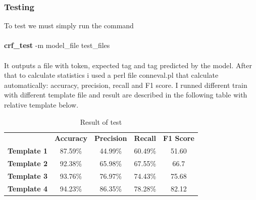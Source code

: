 \documentclass[a4paper,8pt,oneside]{article}
\begin{document}
		\subsubsection{Testing}
			To test we must simply run the command \\ \\
			\textbf{crf\_test} -m model\_file test\_files \\ \\
			It outputs a file with token, expected tag and tag predicted by the model. After that to calculate statistics i used a perl file conneval.pl that calculate automatically: accuracy, precision, recall and F1 score. I runned different train with different template file and result are described in the following table with relative template below.
			\begin{table}[h]
				\centering
				\begin{tabular}{ccccc}
					& \textbf{Accuracy} & \textbf{Precision} & \textbf{Recall}  & \textbf{F1 Score} \\
					\textbf{Template 1} & 87.59\%  & 44.99\%   & 60.49\% & 51.60    \\
					\textbf{Template 2} & 92.38\%  & 65.98\%   & 67.55\% & 66.7     \\
					\textbf{Template 3} & 93.76\%  & 76.97\%   & 74.43\% & 75.68    \\
					\textbf{Template 4} & 94.23\%  & 86.35\%   & 78.28\% & 82.12    \\
				\end{tabular}
				\caption{Result of test}

			\end{table}
\end{document}
